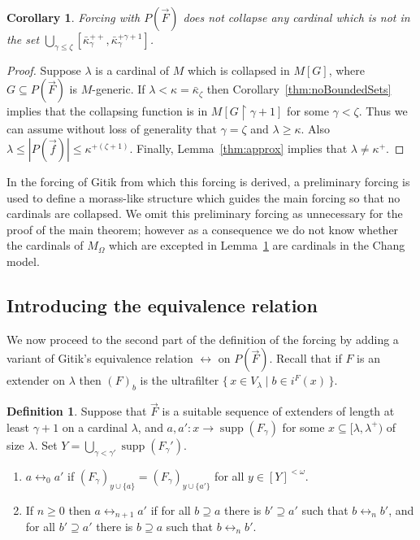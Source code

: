 \documentclass[
twoside,
]{article}
\newtheorem{corollary}[theorem]{Corollary}
\theoremstyle{definition}
\newtheorem{definition}[theorem]{Definition}
\theoremstyle{remark}
\newcommand{\ufFromExt}[2]{(#1)_{#2}}
\newcommand{\forceKappa}{\bar\kappa} %
\DeclareMathOperator{\supp}{supp}   %
\newcommand{\ords}{\Omega}
\newcommand\gkeq{\leftrightarrow}
\newcommand{\sing}[1]{\{#1\}}
\newcommand{\set}[1]{\{\,#1\,\}}
\newcommand{\card}[1]{|#1|}
\newcommand{\restrict}{{\upharpoonright}}
\begin{document}
\begin{corollary} \label{thm:PF-nocollapse}
  Forcing with $P(\vec F)$ does not collapse any cardinal which is not
  in the set $\bigcup_{\gamma\leq\zeta}[\forceKappa_{\gamma}^{++},   \forceKappa^{+\gamma+1}_{\gamma}]$.
\end{corollary}
\begin{proof}
  Suppose $\lambda$ is a cardinal of $M$ which is collapsed in $M[G]$,
  where 
  $G\subseteq P(\vec F)$ is  $M$-generic.    If $\lambda<\kappa=\forceKappa_{\zeta}$ then
  Corollary~\ref{thm:noBoundedSets} implies that the collapsing
  function is in $M[G\restrict\gamma+1]$ for some $\gamma<\zeta$.
  Thus we can assume without loss of generality that  $\gamma=\zeta$
  and $\lambda\geq\kappa$.   Also\,  $\lambda\leq\card{P(\vec
  f)}\leq\kappa^{+(\zeta+1) }$.   
  Finally, Lemma~\ref{thm:approx} implies that $\lambda\not=\kappa^{+}$.
\end{proof}

In the forcing of Gitik from which this forcing is derived, a
preliminary forcing is used to define a morass-like structure
which guides the main forcing so that no cardinals are collapsed.
We omit this preliminary forcing as unnecessary for the proof
of the main theorem; however as a
consequence we do not know whether the cardinals of $M_\ords$ which
are excepted in Lemma~\ref{thm:PF-nocollapse} are cardinals
in the Chang model. 

\subsection{Introducing the equivalence relation}\label{sec:gkeqDef}

We now proceed to the second part of the definition of the forcing by
adding a variant of Gitik's equivalence relation $\gkeq$ on $P(\vec
F)$.    Recall that if $F$ is an extender on $\lambda$ then $\ufFromExt{F}{b}$ is
the ultrafilter $\set{x\in V_\lambda\mid b\in i^{F}(x)}$.

\begin{definition}\label{def:gkeq-a-set}
  Suppose that $\vec F$ is a suitable sequence of extenders of length
  at least $\gamma+1$ on a cardinal $\lambda$, and $a,a'\colon x\to 
  \supp(F_{\gamma})$ for some $x\subseteq[\lambda,\lambda^{+})$ of
  size $\lambda$.    Set $Y=\bigcup_{\gamma<\gamma'}\supp(F_\gamma')$.
  \begin{enumerate}
  \item 
    $a\gkeq_{0}a'$ if 
    $\ufFromExt{F_\gamma}{y\cup\sing{a}}=\ufFromExt{F_\gamma}{y\cup\sing{a'}}$
    for all $y\in[Y]^{<\omega} $.
  \item 
    If $n\geq0$ then  $a\gkeq_{n+1}a'$ if for all $b\supseteq a$
    there is $b'\supseteq a'$ such that $b\gkeq_{n}b'$, and for all
    $b'\supseteq a'$ there is $b\supseteq a$ such that $b\gkeq_{n}b'$.
  \end{enumerate}
\end{definition}
\end{document}
